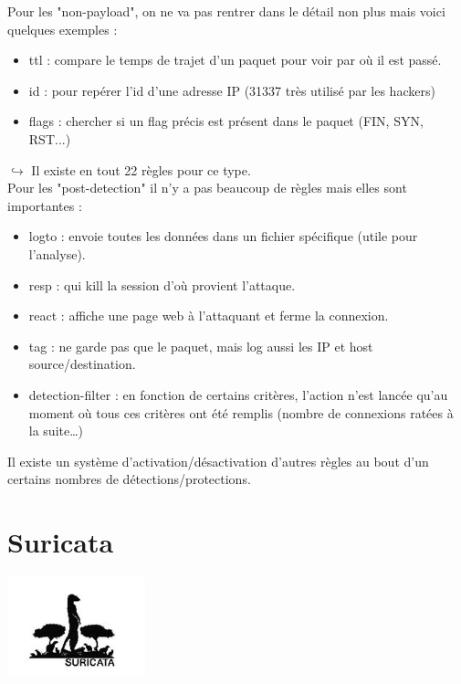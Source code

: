 \documentclass[a4paper,11pt,french]{article}
\begin{document}
Pour les "non-payload", on ne va pas rentrer dans le détail non plus mais voici quelques exemples : 
\begin{itemize}
\item ttl : compare le temps de trajet d’un paquet pour voir par où il est passé.
\item id : pour repérer l’id d’une adresse IP (31337 très utilisé par les hackers)
\item flags : chercher si un flag précis est présent dans le paquet (FIN, SYN, RST...)
\end{itemize}

$\hookrightarrow$ Il existe en tout 22 règles pour ce type.\\


Pour les "post-detection" il n’y a pas beaucoup de règles mais elles sont importantes : 
\begin{itemize}
\item logto : envoie toutes les données dans un fichier spécifique (utile pour l’analyse).
\item resp : qui kill la session d’où provient l’attaque.
\item react : affiche une page web à l’attaquant et ferme la connexion.
\item tag : ne garde pas que le paquet, mais log aussi les IP et host source/destination.
\item detection-filter : en fonction de certains critères, l’action n’est lancée qu’au moment où tous ces critères ont été remplis (nombre de connexions ratées à la suite…)
\end{itemize}

Il existe un système d’activation/désactivation d’autres règles au bout d’un certains nombres de détections/protections.

\newpage
\section{Suricata}
\begin{center}\includegraphics[width=4cm]{icons/suricata.jpg}\end{center}
\end{document}
